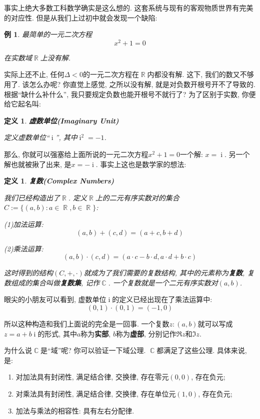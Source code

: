 \documentclass[UTF8]{ctexart}
\newcommand{\<}{\langle}
\renewcommand{\>}{\rangle}
\DeclareMathOperator{\R}{\mathbb{R}}
\DeclareMathOperator{\C}{\mathbb{C}}
\DeclareMathOperator{\ii}{\mathrm{i}}
\newtheorem{dfn}[thm]{定义}
\newtheorem{xmp}{例}[subsection]
\begin{document}
            事实上绝大多数工科数学确实是这么想的. 这套系统与现有的客观物质世界有完美的对应性. 但是从我们上过初中就会发现一个缺陷:

            \begin{xmp}
                最简单的一元二次方程
                \[x^2+1=0\]

                在实数域$\R$上没有解.
            \end{xmp}

            实际上还不止, 任何$\Delta<0$的一元二次方程在$\R$内都没有解. 这下, 我们的数又不够用了. 该怎么办呢? 你直觉上感觉, 之所以没有解, 就是对负数开根号开不了导致的. 根据``缺什么补什么'', 我只要规定负数也能开根号不就行了? 为了区别于实数, 你便给它起名叫:

            \begin{dfn}
                \textbf{虚数单位(Imaginary Unit)}

                定义虚数单位``$\ii$'', 其中$\ii^2=-1$.
            \end{dfn}

            那么, 你就可以强塞给上面所说的一元二次方程$x^2+1=0$一个解: $x=\ii$. 另一个解也就被揪了出来, 是$x=-\ii$. 事实上这也是数学家的想法:

            \begin{dfn}
                \textbf{复数(Complex Numbers)}

                我们已经构造出了$\R$. 定义$\R$上的二元有序实数对的集合$C:=\{(a,b): a\in\R, b\in\R\}$: 

                (1)加法运算:
                \[(a,b)+(c,d)=(a+c,b+d)\]

                (2)乘法运算:
                \[(a,b)\cdot(c,d)=(a\cdot c-b\cdot d, a\cdot d+b\cdot c)\]

                这时得到的结构$(C, +, \cdot)$就成为了我们需要的复数结构, 其中的元素称为\textbf{复数}, 复数组成的集合叫做\textbf{复数集}, 记作$\C$. 一个复数就是一个二元有序实数对$(a,b)$.
            \end{dfn}

            眼尖的小朋友可以看到, 虚数单位$\ii$的定义已经出现在了乘法运算中:
            \[(0,1)\cdot(0,1)=(-1,0)\]

            所以这种构造和我们上面说的完全是一回事. 一个复数$z:(a,b)$就可以写成$z=a+b\ii$的形式, 其中$a$称为\textbf{实部}, $b$称为\textbf{虚部}, 分别记作$\Re z$和$\Im z$.

            为什么说$\C$是``域''呢? 你可以验证一下域公理. $\C$都满足了这些公理. 具体来说, 是:
            \begin{enumerate}
                \item 对加法具有封闭性, 满足结合律, 交换律, 存在零元$(0,0)$, 存在负元;
                \item 对乘法具有封闭性, 满足结合律, 交换律, 存在单位元$(1,0)$, 存在负元; 
                \item 加法与乘法的相容性: 具有左右分配律.
            \end{enumerate}
\end{document}
